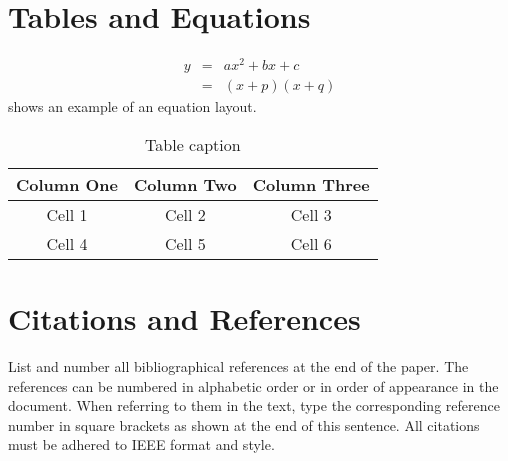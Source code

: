 \documentclass{article}
\begin{document}
\section{Tables and Equations}

\begin{eqnarray}
y &=& ax^2+bx+c \nonumber \\
~ &=& (x+p)(x+q)
\end{eqnarray}
shows an example of an equation layout.

\begin{table}[t]
\begin{center}
\caption{Table caption} \label{tab:cap}
\begin{tabular}{|c|c|c|}
  \hline
  Column One & Column Two & Column Three
  \\
  \hline
  Cell 1 & Cell 2 & Cell 3 \\
  Cell 4 & Cell 5 & Cell 6 \\
  \hline
\end{tabular}
\end{center}
\end{table}



\section{Citations and References}

List and number all bibliographical references at the end of the paper. The references can be numbered in alphabetic order or in order of appearance in the document. When referring to them in the text, type the corresponding reference number in square brackets as shown at the end of this sentence. All citations must be adhered to IEEE format and style. 



\end{document}
